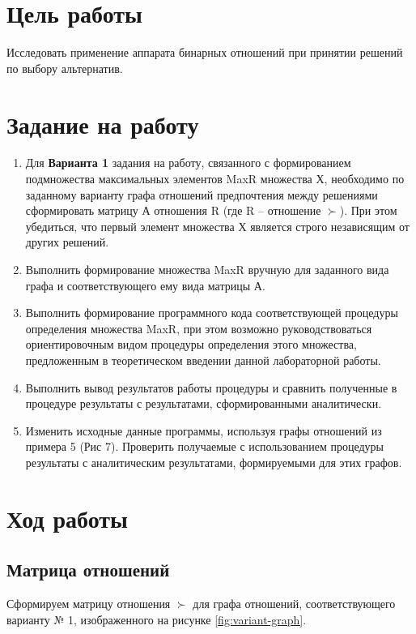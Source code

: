 \documentclass[a4paper,14pt]{extarticle}
\begin{document}


\section{Цель работы}
Исследовать применение аппарата бинарных отношений при принятии решений по
выбору альтернатив.

\section{Задание на работу}

\begin{enumerate}
    \item Для \textbf{Варианта 1} задания на работу, связанного с формированием
          подмножества максимальных элементов MaxR множества Х, необходимо по
          заданному варианту графа отношений предпочтения между решениями
          сформировать матрицу А отношения R (где R – отношение
          $\succ$). При этом убедиться, что первый элемент множества Х
          является строго независящим от других решений.

    \item Выполнить формирование множества MaxR вручную для заданного вида графа
          и соответствующего ему вида матрицы А.

    \item Выполнить формирование программного кода соответствующей процедуры
          определения множества MaxR, при этом возможно руководствоваться
          ориентировочным видом процедуры определения этого множества,
          предложенным в теоретическом введении данной лабораторной работы.

    \item Выполнить вывод результатов работы процедуры и сравнить полученные в
          процедуре результаты с результатами, сформированными аналитически.

    \item Изменить исходные данные программы, используя графы отношений из
          примера 5 (Рис 7). Проверить получаемые с использованием процедуры
          результаты с аналитическим результатами, формируемыми для этих графов.
\end{enumerate}

\section{Ход работы}
\subsection{Матрица отношений}
Сформируем матрицу отношения $\succ$ для графа отношений, соответствующего
варианту № 1, изображенного на рисунке \ref{fig:variant-graph}.
\end{document}

